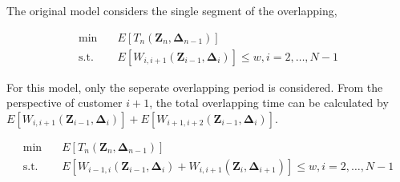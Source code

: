 \documentclass{article}
\newcommand{\Z}{\mathbf{Z}}
\newcommand{\D}{\bm{\Delta}}
\begin{document}




The original model considers the single segment of the overlapping,


\begin{equation}\label{single_overlap}
    \begin{aligned}
        \min \quad & E[T_{n}(\Z_{n}, \D_{n-1})] \\
        \mbox{s.t.} \quad & E[W_{i,i+1}(\Z_{i-1}, \D_{i})] \leq w, i=2,\ldots, N-1
    \end{aligned}
\end{equation}

For this model, only the seperate overlapping period is considered. From the perspective of customer $i+1$, the total overlapping time can be calculated by $E[W_{i,i+1}(\Z_{i-1}, \D_{i})] + E[W_{i+1,i+2}(\Z_{i-1}, \D_{i})]$.


\begin{equation}\label{total_overlap}
    \begin{aligned}
        \min \quad & E[T_{n}(\Z_{n}, \D_{n-1})] \\
        \mbox{s.t.} \quad & E[W_{i-1,i}(\Z_{i-1}, \D_{i}) + W_{i,i+1}(\Z_{i}, \D_{i+1})] \leq w, i=2,\ldots, N-1
    \end{aligned}
\end{equation}




\end{document}
